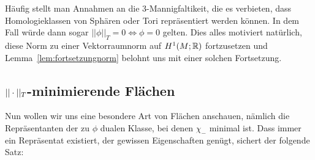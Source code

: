         Häufig stellt man Annahmen an die 3-Mannigfaltikeit, die es verbieten, dass Homologieklassen von Sphären oder Tori repräsentiert werden können. In dem Fall würde dann sogar $||\phi||_T=0 \Leftrightarrow \phi=0$ gelten. Dies alles motiviert natürlich, diese Norm zu einer Vektorraumnorm auf $H^1(M;\mathbb{R})$ fortzusetzen und Lemma~\ref{lem:fortsetzungnorm} belohnt uns mit einer solchen Fortsetzung. 
     
	\subsection{$||\cdot||_T$-minimierende Flächen}

Nun wollen wir uns eine besondere Art von Flächen anschauen, nämlich die Repräsentanten der zu $\phi$ dualen Klasse, bei denen $\chi_-$ minimal ist. Dass immer ein Repräsentat existiert, der gewissen Eigenschaften genügt, sichert der folgende Satz:

